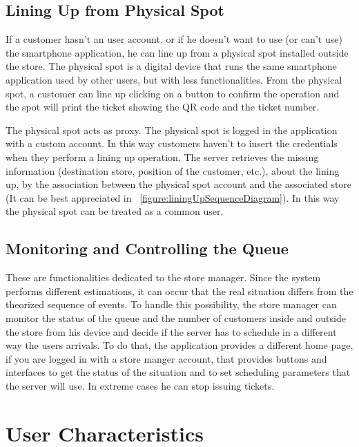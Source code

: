 \subsection{Lining Up from Physical Spot}
If a customer hasn't an user account, or if he doesn't want to use (or can't use) the smartphone application, he can line up from a physical spot installed outside the store.
The physical spot is a digital device that runs the same smartphone application used by other users, but with less functionalities.
From the physical spot, a customer can line up clicking on a button to confirm the operation and the spot will print the ticket showing the QR code and the ticket number.

The physical spot acts as proxy. The physical spot is logged in the application with a custom account. In this way customers haven't to insert the credentials when they perform a lining up operation.
The server retrieves the missing information (destination store, position of the customer, etc.), about the lining up, by the association between the physical spot account and the associated store (It can be best appreciated in ~\ref{figure:liningUpSequenceDiagram}).
In this way the physical spot can be treated as a common user.

\subsection{Monitoring and Controlling the Queue}
These are functionalities dedicated to the store manager. Since the system performs different estimations, it can occur that the real situation differs from the theorized sequence of events.
To handle this possibility, the store manager can monitor the status of the queue and the number of customers inside and outside the store from his device and decide if the server has to schedule in a different way the users arrivals.
To do that, the application provides a different home page, if you are logged in with a store manger account, that provides buttons and interfaces to get the status of the situation and to set scheduling parameters that the server will use. In extreme cases he can stop issuing tickets.


\section{User Characteristics}

